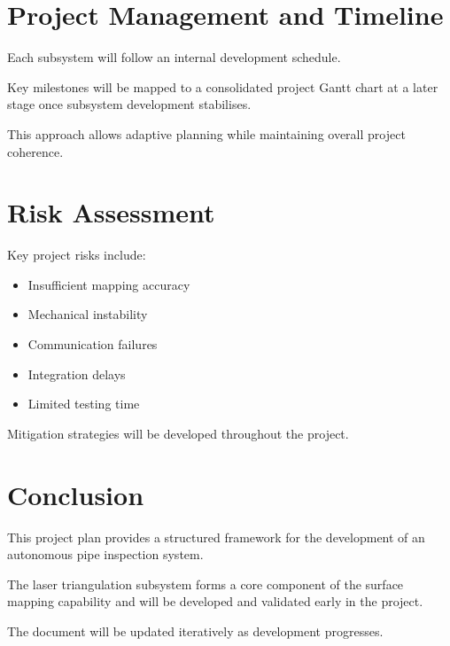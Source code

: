 \documentclass[11pt,a4paper]{article}
\begin{document}
\section{Project Management and Timeline}

Each subsystem will follow an internal development schedule.

Key milestones will be mapped to a consolidated project Gantt chart at a later stage once subsystem development stabilises.

This approach allows adaptive planning while maintaining overall project coherence.

\section{Risk Assessment}

Key project risks include:

\begin{itemize}
  \item Insufficient mapping accuracy
  \item Mechanical instability
  \item Communication failures
  \item Integration delays
  \item Limited testing time
\end{itemize}

Mitigation strategies will be developed throughout the project.

\section{Conclusion}

This project plan provides a structured framework for the development of an autonomous pipe inspection system.

The laser triangulation subsystem forms a core component of the surface mapping capability and will be developed and validated early in the project.

The document will be updated iteratively as development progresses.
\end{document}
